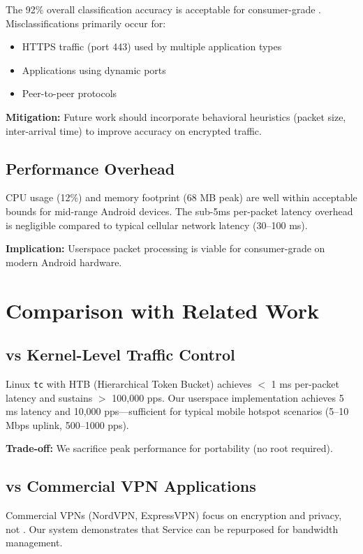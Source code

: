 The 92\% overall classification accuracy is acceptable for consumer-grade \qos. Misclassifications primarily occur for:
\begin{itemize}
    \item HTTPS traffic (port 443) used by multiple application types
    \item Applications using dynamic ports
    \item Peer-to-peer protocols
\end{itemize}

\textbf{Mitigation:} Future work should incorporate behavioral heuristics (packet size, inter-arrival time) to improve accuracy on encrypted traffic.

\subsection{Performance Overhead}

CPU usage (12\%) and memory footprint (68 MB peak) are well within acceptable bounds for mid-range Android devices. The sub-5ms per-packet latency overhead is negligible compared to typical cellular network latency (30–100 ms).

\textbf{Implication:} Userspace packet processing is viable for consumer-grade \qos on modern Android hardware.

\section{Comparison with Related Work}

\subsection{vs Kernel-Level Traffic Control}

Linux \texttt{tc} with HTB (Hierarchical Token Bucket) achieves $<$ 1 ms per-packet latency and sustains $>$ 100,000 pps. Our userspace implementation achieves 5 ms latency and 10,000 pps—sufficient for typical mobile hotspot scenarios (5–10 Mbps uplink, 500–1000 pps).

\textbf{Trade-off:} We sacrifice peak performance for portability (no root required).

\subsection{vs Commercial VPN Applications}

Commercial VPNs (NordVPN, ExpressVPN) focus on encryption and privacy, not \qos. Our system demonstrates that \vpn Service can be repurposed for bandwidth management.

